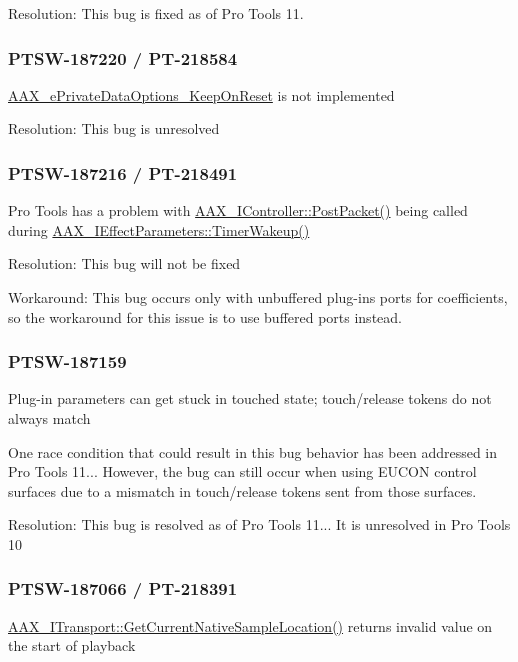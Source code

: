 Resolution\+: This bug is fixed as of Pro Tools 11.\hypertarget{a00374_PTSW-187220}{}\subsubsection{P\+T\+S\+W-\/187220 / P\+T-\/218584}\label{a00374_PTSW-187220}
\hyperlink{a00206_a9f1ef2cb64daf30eaf145dfbb8cd0d00a393309ed2a9c5d784e837705a58854ab}{A\+A\+X\+\_\+e\+Private\+Data\+Options\+\_\+\+Keep\+On\+Reset} is not implemented

Resolution\+: This bug is unresolved\hypertarget{a00374_PTSW-187216}{}\subsubsection{P\+T\+S\+W-\/187216 / P\+T-\/218491}\label{a00374_PTSW-187216}
Pro Tools has a problem with \hyperlink{a00090_ae5dd2b5925dbc181513bca1c4ac5e716}{A\+A\+X\+\_\+\+I\+Controller\+::\+Post\+Packet()} being called during \hyperlink{a00061_ab5b8da9e1a9d778d327ac04f4ab8d139}{A\+A\+X\+\_\+\+I\+Effect\+Parameters\+::\+Timer\+Wakeup()}

Resolution\+: This bug will not be fixed

Workaround\+: This bug occurs only with unbuffered plug-\/ins\textquotesingle{} ports for coefficients, so the workaround for this issue is to use buffered ports instead.\hypertarget{a00374_PTSW-187159}{}\subsubsection{P\+T\+S\+W-\/187159}\label{a00374_PTSW-187159}
Plug-\/in parameters can get stuck in touched state; touch/release tokens do not always match

One race condition that could result in this bug behavior has been addressed in Pro Tools 11... However, the bug can still occur when using E\+U\+C\+O\+N control surfaces due to a mismatch in touch/release tokens sent from those surfaces.

Resolution\+: This bug is resolved as of Pro Tools 11... It is unresolved in Pro Tools 10\hypertarget{a00374_PTSW-187066}{}\subsubsection{P\+T\+S\+W-\/187066 / P\+T-\/218391}\label{a00374_PTSW-187066}
\hyperlink{a00116_a8119233b03774528ffaa519771d792a0}{A\+A\+X\+\_\+\+I\+Transport\+::\+Get\+Current\+Native\+Sample\+Location()} returns invalid value on the start of playback

